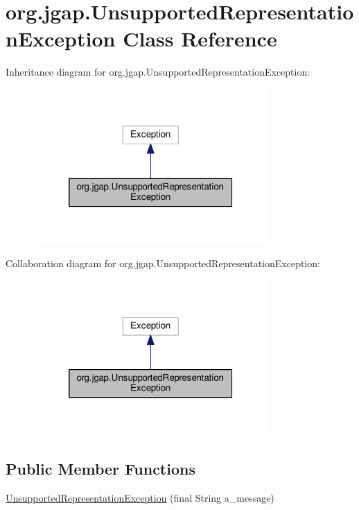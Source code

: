 \hypertarget{classorg_1_1jgap_1_1_unsupported_representation_exception}{\section{org.\-jgap.\-Unsupported\-Representation\-Exception Class Reference}
\label{classorg_1_1jgap_1_1_unsupported_representation_exception}
}


Inheritance diagram for org.\-jgap.\-Unsupported\-Representation\-Exception\-:
\nopagebreak
\begin{figure}[H]
\begin{center}
\leavevmode
\includegraphics[width=254pt]{classorg_1_1jgap_1_1_unsupported_representation_exception__inherit__graph}
\end{center}
\end{figure}


Collaboration diagram for org.\-jgap.\-Unsupported\-Representation\-Exception\-:
\nopagebreak
\begin{figure}[H]
\begin{center}
\leavevmode
\includegraphics[width=254pt]{classorg_1_1jgap_1_1_unsupported_representation_exception__coll__graph}
\end{center}
\end{figure}
\subsection*{Public Member Functions}
\begin{DoxyCompactItemize}
\item 
\hyperlink{classorg_1_1jgap_1_1_unsupported_representation_exception_a139a57a96d46c1bcaab039cabc7afef3}{Unsupported\-Representation\-Exception} (final String a\-\_\-message)
\end{DoxyCompactItemize}
